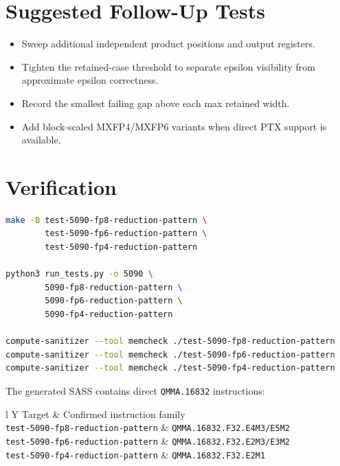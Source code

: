 \documentclass[11pt]{article}
\begin{document}
\section{Suggested Follow-Up Tests}

\begin{itemize}
\item Sweep additional independent product positions and output registers.
\item Tighten the retained-case threshold to separate epsilon visibility from
  approximate epsilon correctness.
\item Record the smallest failing gap above each max retained width.
\item Add block-scaled MXFP4/MXFP6 variants when direct PTX support is
  available.
\end{itemize}

\section{Verification}

\begin{lstlisting}[language=bash]
make -B test-5090-fp8-reduction-pattern \
        test-5090-fp6-reduction-pattern \
        test-5090-fp4-reduction-pattern

python3 run_tests.py -o 5090 \
        5090-fp8-reduction-pattern \
        5090-fp6-reduction-pattern \
        5090-fp4-reduction-pattern

compute-sanitizer --tool memcheck ./test-5090-fp8-reduction-pattern
compute-sanitizer --tool memcheck ./test-5090-fp6-reduction-pattern
compute-sanitizer --tool memcheck ./test-5090-fp4-reduction-pattern
\end{lstlisting}

The generated SASS contains direct \texttt{QMMA.16832} instructions:

\begin{tabularx}{\linewidth}{l Y}
\toprule
Target & Confirmed instruction family \\
\midrule
\texttt{test-5090-fp8-reduction-pattern} & \texttt{QMMA.16832.F32.E4M3/E5M2} \\
\texttt{test-5090-fp6-reduction-pattern} & \texttt{QMMA.16832.F32.E2M3/E3M2} \\
\texttt{test-5090-fp4-reduction-pattern} & \texttt{QMMA.16832.F32.E2M1} \\
\bottomrule
\end{tabularx}
\end{document}
